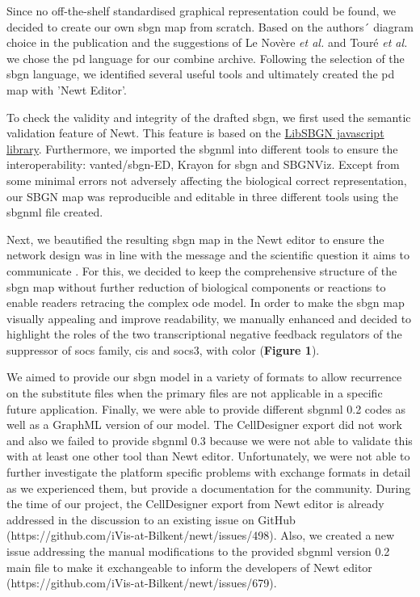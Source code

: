 Since no off-the-shelf standardised graphical representation could be found, we decided to create our own \ac{sbgn} map from scratch. Based on the authors´ diagram choice in the publication and the suggestions of Le Novère \textit{et al.} \cite{sbgnnovere} and Touré \textit{et al.} \cite{sbgntoure} we chose the \ac{pd} language for our \ac{combine} archive. Following the selection of the \ac{sbgn} language, we identified several useful tools and ultimately created the \ac{pd} map with 'Newt Editor'. 

To check the validity and integrity of the drafted \ac{sbgn}, we first used the semantic validation feature of Newt. This feature is based on the \hyperlink{https://github.com/sbgn/libsbgn}{LibSBGN javascript library}\cite{van2012software}. Furthermore, we imported the \ac{sbgnml} into different tools to ensure the interoperability: \acs{vanted}/\acs{sbgn}-ED, Krayon for \ac{sbgn} and SBGNViz. Except from some minimal errors not adversely affecting the biological correct representation, our SBGN map was reproducible and editable in three different tools using the \ac{sbgnml} file created.

Next, we beautified the resulting \ac{sbgn} map in the Newt editor to ensure the network design was in line with the message and the scientific question it aims to communicate \cite{sbgntoure}.  For this, we decided to keep the comprehensive structure of the \ac{sbgn} map without further reduction of biological components or reactions to enable readers retracing the complex \ac{ode} model. In order to make the \ac{sbgn} map visually appealing and improve readability, we manually enhanced and decided to highlight the roles of the two transcriptional negative feedback regulators of the suppressor of \ac{socs} family, \ac{cis} and \ac{socs}3, with color (\textbf{Figure 1}). 

We aimed to provide our \ac{sbgn} model in a variety of formats to allow recurrence on the substitute files when the primary files are not applicable in a specific future application. Finally, we were able to provide different \ac{sbgnml} 0.2 codes as well as a GraphML version of our model. The CellDesigner export did not work and also we failed to provide \ac{sbgnml} 0.3 because we were not able to validate this with at least one other tool than Newt editor. Unfortunately, we were not able to further investigate the platform specific problems with exchange formats in detail as we experienced them, but provide a documentation for the community. During the time of our project, the CellDesigner export from Newt editor is already addressed in the discussion to an existing issue on GitHub (https://github.com/iVis-at-Bilkent/newt/issues/498). Also, we created a new issue addressing the manual modifications to the provided \ac{sbgnml} version 0.2 main file to make it exchangeable to inform the developers of Newt editor (https://github.com/iVis-at-Bilkent/newt/issues/679).

